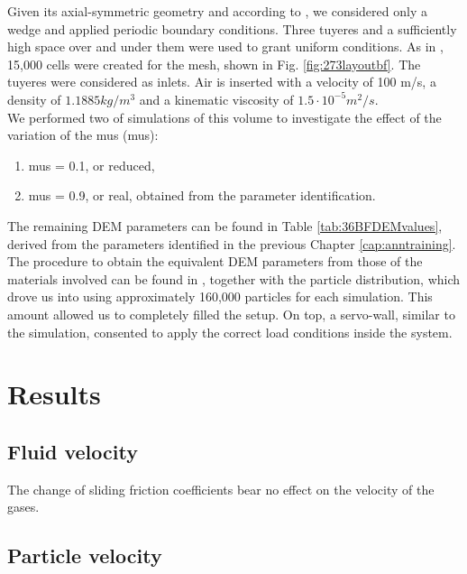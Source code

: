 Given its axial-symmetric geometry and according to \citet{RefWorks:208}, we
considered only a wedge and applied periodic boundary conditions.
Three tuyeres and a sufficiently high space over and under them were used to
grant uniform conditions.
As in \citet{RefWorks:208}, 15,000 cells were created for the mesh, shown in
Fig. \ref{fig:273layoutbf}. 
The tuyeres were considered as inlets. Air is inserted with a velocity of 100
m/s, a density of $1.1885 kg/m^3$ and a kinematic viscosity of $1.5 \cdot
10^{-5} m^2/s$.\\
We performed two of simulations of this volume to investigate
the effect of the variation of the \acl{mus} (\acs{mus}):
\begin{enumerate}
  \item{\acs{mus} = 0.1, or reduced,}
  \item{\acs{mus} = 0.9, or real, obtained from the parameter identification.}
\end{enumerate}
The remaining \acs{DEM} parameters can be found in Table
\ref{tab:36BFDEMvalues}, derived from the parameters identified in the previous
Chapter \ref{cap:anntraining}.
The procedure to obtain the equivalent \acs{DEM} parameters from those of the
materials involved can be found in \citet{RefWorks:208}, together with the
particle distribution, which drove us into using approximately 160,000 particles
for each simulation.
This amount allowed us to completely filled the setup.
On top, a servo-wall, similar to the  simulation, consented to apply
the correct load conditions inside the system.




\section{Results}
\label{sec:resultsbf}

\subsection{Fluid velocity}
\label{subsec:fluidvelocity}


The change of sliding friction coefficients bear no effect on the
velocity of the gases. 



\subsection{Particle velocity}
\label{subsec:particlevelocity}


